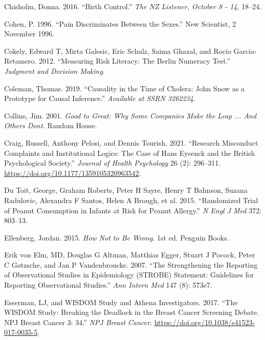 \documentclass[
  10pt,
  b5paper]{book}
\newlength{\cslhangindent}
\newlength{\cslentryspacingunit} %
\newenvironment{CSLReferences}[2] %
 {%
  \setlength{\parindent}{0pt}
  \ifodd #1
  \let\oldpar\par
  \def\par{\hangindent=\cslhangindent\oldpar}
  \fi
  \setlength{\parskip}{#2\cslentryspacingunit}
 }%
 {}
\begin{document}
\begin{CSLReferences}{1}{0}
\leavevmode{}%
Chisholm, Donna. 2016. {``Birth Control.''} \emph{The NZ Listener, October 8 - 14}, 18--24.

\leavevmode{}%
Cohen, P. 1996. {``Pain Discriminates Between the Sexes.''} New Scientist, 2 November 1996.

\leavevmode{}%
Cokely, Edward T, Mirta Galesic, Eric Schulz, Saima Ghazal, and Rocio Garcia-Retamero. 2012. {``Measuring Risk Literacy: The Berlin Numeracy Test.''} \emph{Judgment and Decision Making}.

\leavevmode{}%
Coleman, Thomas. 2019. {``Causality in the Time of Cholera: John {S}now as a Prototype for Causal Inference.''} \emph{Available at SSRN 3262234}.

\leavevmode{}%
Collins, Jim. 2001. \emph{Good to Great: Why Some Companies Make the Leap ... And Others Dont}. Random House.

\leavevmode{}%
Craig, Russell, Anthony Pelosi, and Dennis Tourish. 2021. {``Research Misconduct Complaints and Institutional Logics: The Case of Hans Eysenck and the British Psychological Society.''} \emph{Journal of Health Psychology} 26 (2): 296--311. \url{https://doi.org/10.1177/1359105320963542}.

\leavevmode{}%
Du Toit, George, Graham Roberts, Peter H Sayre, Henry T Bahnson, Suzana Radulovic, Alexandra F Santos, Helen A Brough, et al. 2015. {``Randomized Trial of Peanut Consumption in Infants at Risk for Peanut Allergy.''} \emph{N Engl J Med} 372: 803--13.

\leavevmode{}%
Ellenberg, Jordan. 2015. \emph{How Not to Be Wrong}. 1st ed. Penguin Books.

\leavevmode{}%
Erik von Elm, MD, Douglas G Altman, Matthias Egger, Stuart J Pocock, Peter C Gøtzsche, and Jan P Vandenbroucke. 2007. {``The Strengthening the Reporting of Observational Studies in Epidemiology (STROBE) Statement: Guidelines for Reporting Observational Studies.''} \emph{Ann Intern Med} 147 (8): 573e7.

\leavevmode{}%
Esserman, LJ, and WISDOM Study and Athena Investigators. 2017. {``The WISDOM Study: Breaking the Deadlock in the Breast Cancer Screening Debate. NPJ Breast Cancer 3: 34.''} \emph{NPJ Breast Cancer}. \url{https://doi.org/10.1038/s41523-017-0035-5}.


\end{CSLReferences}
\end{document}
